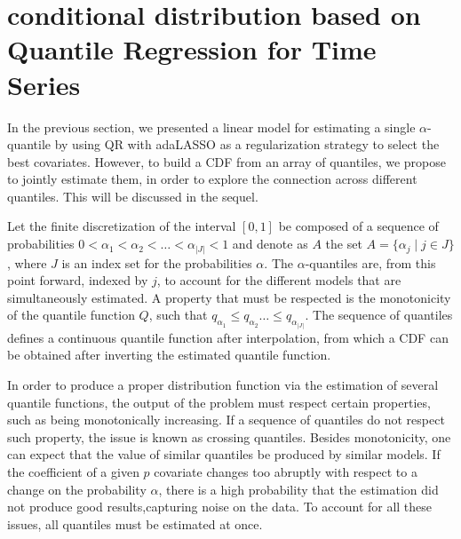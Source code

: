 \section{conditional distribution based on Quantile Regression for Time Series}

In the previous section, we presented a linear model for estimating a single $\alpha$-quantile by using QR with adaLASSO as a regularization strategy to select the best covariates. However, to build a CDF from an array of quantiles, we propose to jointly estimate them, in order to explore the connection across different quantiles. This will be discussed in the sequel.

Let the finite discretization of the interval $[0,1]$ be composed of a sequence of probabilities $0 < \alpha_1 < \alpha_2 < \dots < \alpha_{|J|} < 1$ and denote as $A$ the set $A = \{ \alpha_j \mid j \in J \}$, where $J$ is an index set for the probabilities $\alpha$. 
The $\alpha$-quantiles are, from this point forward, indexed by $j$, to account for the different models that are simultaneously estimated. A property that must be respected is the monotonicity of the quantile function $Q$, such that $q_{\alpha_1} \leq q_{\alpha_2} \dots \leq q_{\alpha_{|J|}}$.
The sequence of quantiles defines a continuous quantile function after interpolation, from which a CDF can be obtained after inverting the estimated quantile function.


In order to produce a proper distribution function via the estimation of several quantile functions, the output of the problem must respect certain properties, such as being monotonically increasing. 
If a sequence of quantiles do not respect such property, the issue is known as crossing quantiles.
Besides monotonicity, one can expect that the value of similar quantiles be produced by similar models. 
If the coefficient of a given $p$ covariate changes too abruptly with respect to a change on the probability $\alpha$, there is a high probability that the estimation did not produce good results,capturing noise on the data.  
To account for all these issues, all quantiles must be estimated at once. 

